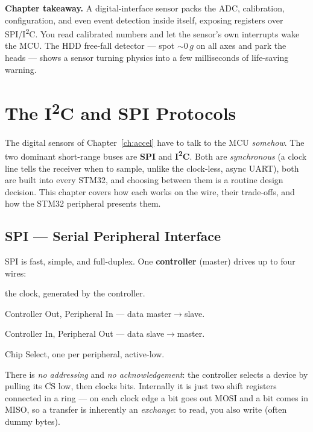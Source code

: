 \documentclass[11pt,a4paper,oneside]{book}
\begin{document}
\begin{keyidea}
\textbf{Chapter takeaway.} A digital-interface sensor packs the ADC,
calibration, configuration, and even event detection inside itself, exposing
registers over SPI/I\textsuperscript{2}C. You read calibrated numbers and let the
sensor's own interrupts wake the MCU. The HDD free-fall detector --- spot
$\sim\!0\,g$ on all axes and park the heads --- shows a sensor turning physics
into a few milliseconds of life-saving warning.
\end{keyidea}

\chapter{The I\textsuperscript{2}C and SPI Protocols}
\label{ch:i2cspi}

The digital sensors of Chapter~\ref{ch:accel} have to talk to the MCU
\emph{somehow}. The two dominant short-range buses are \textbf{SPI} and
\textbf{I\textsuperscript{2}C}. Both are \emph{synchronous} (a clock line tells
the receiver when to sample, unlike the clock-less, async UART), both are built
into every STM32, and choosing between them is a routine design decision. This
chapter covers how each works on the wire, their trade-offs, and how the STM32
peripheral presents them.

\section{SPI --- Serial Peripheral Interface}
SPI is fast, simple, and full-duplex. One \textbf{controller} (master) drives up
to four wires:
\begin{description}[leftmargin=1.8cm,style=nextline]
  \item[SCLK] the clock, generated by the controller.
  \item[MOSI] Controller Out, Peripheral In --- data master$\to$slave.
  \item[MISO] Controller In, Peripheral Out --- data slave$\to$master.
  \item[$\overline{\text{CS}}$] Chip Select, one per peripheral, active-low.
\end{description}
There is \emph{no addressing} and \emph{no acknowledgement}: the controller
selects a device by pulling its $\overline{\text{CS}}$ low, then clocks bits.
Internally it is just two shift registers connected in a ring --- on each clock
edge a bit goes out MOSI and a bit comes in MISO, so a transfer is inherently an
\emph{exchange}: to read, you also write (often dummy bytes).
\end{document}
